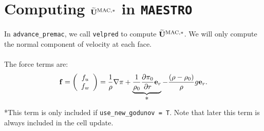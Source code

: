 \section{Computing $\widetilde{{\bf U}}^{\rm MAC,*}$ in {\tt MAESTRO}}
In {\tt advance\_premac}, we call {\tt velpred} to compute
$\widetilde{{\bf U}}^{\rm MAC,*}$.  We will only compute the normal component of
velocity at each face.\\ \\
The force terms are:
\begin{equation}
{\bf f} =
\left(\begin{array}{c}
f_u \\
f_w \\
\end{array}\right)
= \frac{1}{\rho}\nabla\pi + \underbrace{\frac{1}{\rho_0}\frac{\partial\pi_0}{\partial r}{\bf e}_r}_{\hbox{*}} - \frac{(\rho-\rho_0)}{\rho}g{\bf e}_r.\label{Force Term}
\end{equation}
*This term is only included if {\tt use\_new\_godunov = T}.  Note that 
later this term is always included in the cell update.
